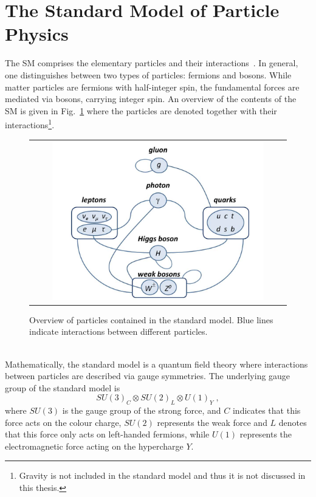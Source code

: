 \section{The Standard Model of Particle Physics}
\label{sec:sm}
The SM comprises the elementary particles and their interactions~\cite{bib:PDG:2012}. In general, one distinguishes between two types of particles: fermions and bosons. While matter particles are fermions with half-integer spin, the fundamental forces are mediated via bosons, carrying integer spin. An overview of the contents of the SM is given in Fig.~\ref{fig:SM} where the particles are denoted together with their interactions\footnote{Gravity is not included in the standard model and thus it is not discussed in this thesis.}. 
\begin{figure}[!tp]
  \centering 
  \begin{tabular}{c}
    \includegraphics[width=0.85\textwidth]{figures/SM.jpg}
  \end{tabular}
  \caption{Overview of particles contained in the standard model. Blue lines indicate interactions between different particles.}
  \label{fig:SM}
\end{figure}
\\
Mathematically, the standard model is a quantum field theory where interactions between particles are described via gauge symmetries. The underlying gauge group of the standard model is 
\begin{equation*}
SU(3)_{C} \otimes SU(2)_{L} \otimes U(1)_{Y} \; ,
\end{equation*}
where $SU(3)$ is the gauge group of the strong force, and $C$ indicates that this force acts on the colour charge, $SU(2)$ represents the weak force and $L$ denotes that this force only acts on left-handed fermions, while $U(1)$ represents the electromagnetic force acting on the hypercharge $Y$.\\
